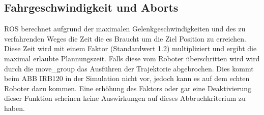 \subsection{Fahrgeschwindigkeit und Aborts}
ROS berechnet aufgrund der maximalen Gelenkgeschwindigkeiten und des zu verfahrenden Weges die Zeit die es Braucht um die Ziel Position zu erreichen. Diese Zeit wird mit einem Faktor (Standardwert 1.2) multipliziert und ergibt die maximal erlaubte Plannungszeit. Falls diese vom Roboter überschritten wird wird durch die move\_group das Ausführen der Trajektorie abgebrochen. Dies kommt beim ABB IRB120 in der Simulation nicht vor, jedoch kann es auf dem echten Roboter dazu kommen. Eine erhöhung des Faktors oder gar eine Deaktivierung dieser Funktion scheinen keine Auswirkungen auf dieses Abbruchkriterium zu haben.
